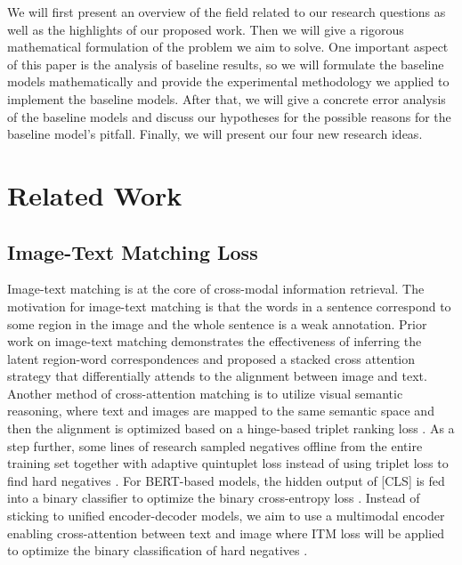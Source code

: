 \documentclass[nohyperref]{article}
\theoremstyle{plain}
\theoremstyle{definition}
\theoremstyle{remark}
\begin{document}
We will first present an overview of the field related to our research questions as well as the highlights of our proposed work. Then we will give a rigorous mathematical formulation of the problem we aim to solve. One important aspect of this paper is the analysis of baseline results, so we will formulate the baseline models mathematically and provide the experimental methodology we applied to implement the baseline models. After that, we will give a concrete error analysis of the baseline models and discuss our hypotheses for the possible reasons for the baseline model's pitfall. Finally, we will present our four new research ideas.


\section{Related Work}
\subsection{Image-Text Matching Loss}
Image-text matching is at the core of cross-modal information retrieval. The motivation for image-text matching is that the words in a sentence correspond to some region in the image and the whole sentence is a weak annotation. Prior work on image-text matching demonstrates the effectiveness of inferring the latent region-word correspondences \citep{itm-feifei} and \citet{ITM_cross_attn} proposed a stacked cross attention strategy that differentially attends to the alignment between image and text. Another method of cross-attention matching is to utilize visual semantic reasoning, where text and images are mapped to the same semantic space and then the alignment is optimized based on a hinge-based triplet ranking loss \citep{itm-semantic}. As a step further, some lines of research sampled negatives offline from the entire training set together with adaptive quintuplet loss instead of using triplet loss to find hard negatives \citep{itm-quintuplet}. For BERT-based models, the hidden output of [CLS] is fed into a binary classifier to optimize the binary cross-entropy loss \citep{itm-bert}. Instead of sticking to unified encoder-decoder models, we aim to use a multimodal encoder enabling cross-attention between text and image where ITM loss will be applied to optimize the binary classification of hard negatives \citep{albef}. 
\end{document}

